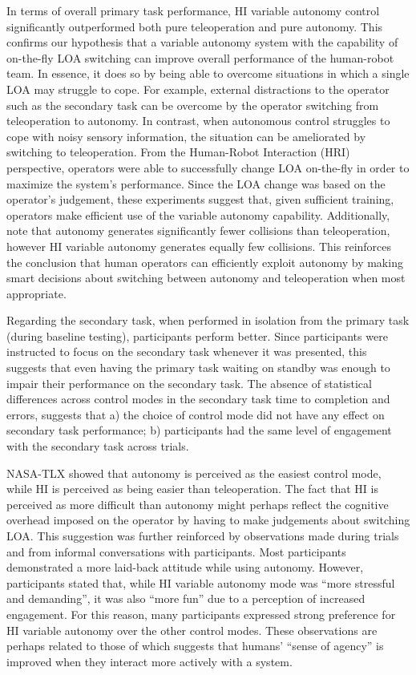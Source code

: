 \documentclass[a4paper,12pt,oneside,openright]{bhamthesis}
\begin{document}
In terms of overall primary task performance, HI variable autonomy control significantly outperformed both pure teleoperation and pure autonomy. This confirms our hypothesis that a variable autonomy system with the capability of on-the-fly LOA switching can improve overall performance of the human-robot team. In essence, it does so by being able to overcome situations in which a single LOA may struggle to cope. For example, external distractions to the operator such as the secondary task can be overcome by the operator switching from teleoperation to autonomy. In contrast, when autonomous control struggles to cope with noisy sensory information, the situation can be ameliorated by switching to teleoperation. From the Human-Robot Interaction (HRI) perspective, operators were able to successfully change LOA on-the-fly in order to maximize the system's performance. Since the LOA change was based on the operator's judgement, these experiments suggest that, given sufficient training, operators make efficient use of the variable autonomy capability. Additionally, note that autonomy generates significantly fewer collisions than teleoperation, however HI variable autonomy generates equally few collisions. This reinforces the conclusion that human operators can efficiently exploit autonomy by making smart decisions about switching between autonomy and teleoperation when most appropriate. 

Regarding the secondary task, when performed in isolation from the primary task (during baseline testing), participants perform better. Since participants were instructed to focus on the secondary task whenever it was presented, this suggests that even having the primary task waiting on standby was enough to impair their performance on the secondary task. The absence of statistical differences across control modes in the secondary task time to completion and errors, suggests that a) the choice of control mode did not have any effect on secondary task performance; b) participants had the same level of engagement with the secondary task across trials.

NASA-TLX showed that autonomy is perceived as the easiest control mode, while HI is perceived as being easier than teleoperation. The fact that HI is perceived as more difficult than autonomy might perhaps reflect the cognitive overhead imposed on the operator by having to make judgements about switching LOA. This suggestion was further reinforced by observations made during trials and from informal conversations with participants. Most participants demonstrated a more laid-back attitude while using autonomy. However, participants stated that, while HI variable autonomy mode was ``more stressful and demanding'', it was also ``more fun'' due to a perception of increased engagement. For this reason, many participants expressed strong preference for HI variable autonomy over the other control modes. These observations are perhaps related to those of \citep{Wen2015} which suggests that humans' ``sense of agency'' is improved when they interact more actively with a system.
\end{document}

